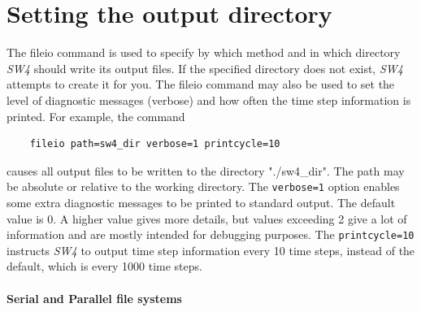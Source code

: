 \documentclass[11pt]{report}
\begin{document}
\section{Setting the output directory}\label{sec:output-dir}
The fileio command is used to specify by which method and in which directory \emph{SW4} should write
its output files.  If the specified directory does not exist, \emph{SW4} attempts to create it for you. The
fileio command may also be used to set the level of diagnostic messages (verbose) and how often the
time step information is printed. For example, the command
\begin{verbatim}
	fileio path=sw4_dir verbose=1 printcycle=10
\end{verbatim}
causes all output files to be written to the directory "./sw4\_dir". The path may be absolute or
relative to the working directory. The \verb+verbose=1+ option enables some extra diagnostic
messages to be printed to standard output. The default value is 0. A higher value gives more
details, but values exceeding 2 give a lot of information and are mostly intended for debugging
purposes. The \verb+printcycle=10+ instructs \emph{SW4} to output time step information every 10
time steps, instead of the default, which is every 1000 time steps.

\paragraph{Serial and Parallel file systems}
\end{document}
